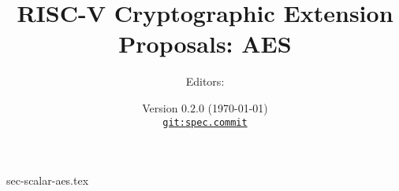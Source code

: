 \documentclass[11pt]{article}
\title{RISC-V Cryptographic Extension Proposals: AES}
\author{Editors: }
\date{Version $0.2.0$ (\today) \\
\href{https://github.com/scarv/riscv-crypto}{
{\small \tt git:{spec.commit}}}
}
\begin{document}

\maketitle

{sec-scalar-aes.tex}


\newpage
\printbibliography

\end{document}
